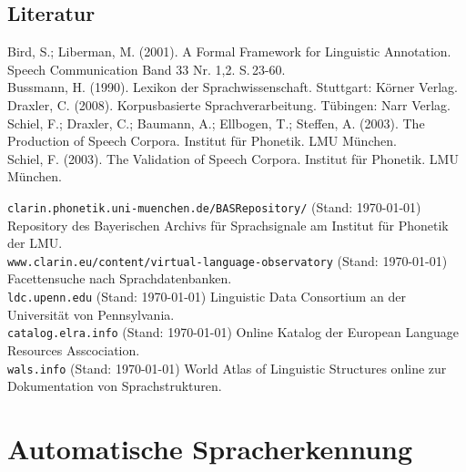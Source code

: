 \documentclass[11pt]{book}
\begin{document}
\section{Literatur}

Bird, S.; Liberman, M. (2001). A Formal Framework for Linguistic Annotation. Speech Communication Band 33 Nr. 1,2. S.\,23-60. \newline\\
Bussmann, H. (1990). Lexikon der Sprachwissenschaft. Stuttgart: Körner Verlag.\newline\\
Draxler, C. (2008). Korpusbasierte Sprachverarbeitung. Tübingen: Narr Verlag. \newline\\
Schiel, F.; Draxler, C.; Baumann, A.; Ellbogen, T.; Steffen, A. (2003). The Production of Speech Corpora. Institut für Phonetik. LMU München.\newline\\
Schiel, F. (2003). The Validation of Speech Corpora. Institut für Phonetik. LMU München.


\label{link_clarin_repository}
{\tt clarin.phonetik.uni-muenchen.de/BASRepository/} (Stand: \today) Repository des Bayerischen Archivs für Sprachsignale am Institut für Phonetik der LMU.\newline\\
{\tt www.clarin.eu/content/virtual-language-observatory} (Stand: \today) Facettensuche nach Sprachdatenbanken.\newline\\
{\tt ldc.upenn.edu} (Stand: \today) Linguistic Data Consortium an der Universität von Pennsylvania.\newline\\
{\tt catalog.elra.info} (Stand: \today) Online Katalog der European Language Resources Asscociation.\newline\\
{\tt wals.info} (Stand: \today) World Atlas of Linguistic Structures online zur Dokumentation von Sprachstrukturen.








\chapter{Automatische Spracherkennung}
\end{document}
